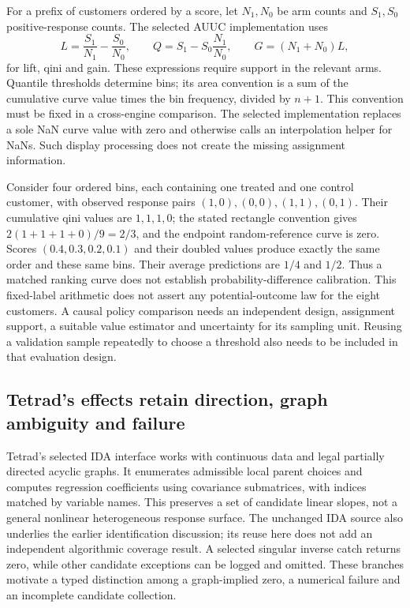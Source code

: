 For a prefix of customers ordered by a score, let $N_1,N_0$ be arm counts
and $S_1,S_0$ positive-response counts. The selected AUUC implementation uses
\begin{equation}
 L=\frac{S_1}{N_1}-\frac{S_0}{N_0},\qquad
 Q=S_1-S_0\frac{N_1}{N_0},\qquad
 G=(N_1+N_0)L,
 \label{exec20:javafx-curves}
\end{equation}
for lift, qini and gain. These expressions require support in the relevant
arms. Quantile thresholds determine bins; its area convention is a sum of
the cumulative curve value times the bin frequency, divided by $n+1$.
This convention must be fixed in a cross-engine comparison. The selected
implementation replaces a sole NaN curve value with zero and otherwise calls
an interpolation helper for NaNs. Such display processing does not create
the missing assignment information.
\citep{exec20_javaeffects_h2o}

Consider four ordered bins, each containing one treated and one control
customer, with observed response pairs $(1,0),(0,0),(1,1),(0,1)$. Their
cumulative qini values are $1,1,1,0$; the stated rectangle convention gives
$2(1+1+1+0)/9=2/3$, and the endpoint random-reference curve is zero. Scores
$(0.4,0.3,0.2,0.1)$ and their doubled values produce exactly the same order
and these same bins. Their average predictions are $1/4$ and $1/2$. Thus a
matched ranking curve does not establish probability-difference calibration.
This fixed-label arithmetic does not assert any potential-outcome law for
the eight customers. A causal policy comparison needs an independent design,
assignment support, a suitable value estimator and uncertainty for its sampling
unit. Reusing a validation sample repeatedly to choose a threshold also needs
to be included in that evaluation design.
\citep{exec20_javaeffects_reference}

\subsection{Tetrad's effects retain direction, graph ambiguity and failure}
\label{exec20:javafx-graphs}

Tetrad's selected IDA interface works with continuous data and legal partially
directed acyclic graphs. It enumerates admissible local parent choices and
computes regression coefficients using covariance submatrices, with indices
matched by variable names. This preserves a set of candidate linear slopes,
not a general nonlinear heterogeneous response surface. The unchanged IDA
source also underlies the earlier identification discussion; its reuse here
does not add an independent algorithmic coverage result. A selected singular
inverse catch returns zero, while other candidate exceptions can be logged
and omitted. These branches motivate a typed distinction among a graph-implied
zero, a numerical failure and an incomplete candidate collection.
\citep{exec20_javaeffects_tetrad}

